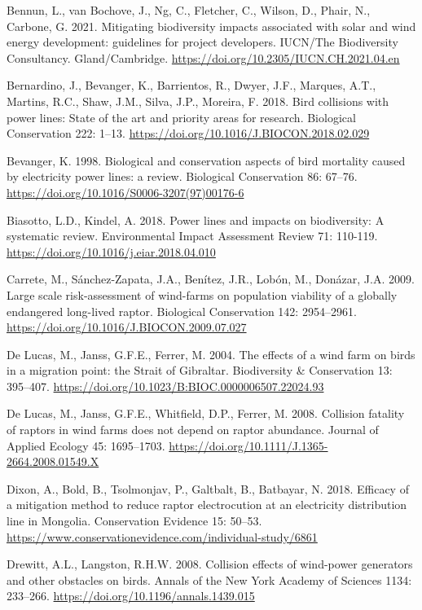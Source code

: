 \documentclass[
  oneside]{scrbook}
\begin{document}
Bennun, L., van Bochove, J., Ng, C., Fletcher, C., Wilson, D., Phair, N., Carbone, G. 2021. Mitigating biodiversity impacts associated with solar and wind energy development: guidelines for project developers. IUCN/The Biodiversity Consultancy. Gland/Cambridge. \url{https://doi.org/10.2305/IUCN.CH.2021.04.en}

Bernardino, J., Bevanger, K., Barrientos, R., Dwyer, J.F., Marques, A.T., Martins, R.C., Shaw, J.M., Silva, J.P., Moreira, F. 2018. Bird collisions with power lines: State of the art and priority areas for research. Biological Conservation 222: 1--13. \url{https://doi.org/10.1016/J.BIOCON.2018.02.029}

Bevanger, K. 1998. Biological and conservation aspects of bird mortality caused by electricity power lines: a review. Biological Conservation 86: 67--76. \url{https://doi.org/10.1016/S0006-3207(97)00176-6}

Biasotto, L.D., Kindel, A. 2018. Power lines and impacts on biodiversity: A systematic review. Environmental Impact Assessment Review 71: 110-119. \url{https://doi.org/10.1016/j.eiar.2018.04.010}

Carrete, M., Sánchez-Zapata, J.A., Benítez, J.R., Lobón, M., Donázar, J.A. 2009. Large scale risk-assessment of wind-farms on population viability of a globally endangered long-lived raptor. Biological Conservation 142: 2954--2961. \url{https://doi.org/10.1016/J.BIOCON.2009.07.027}

De Lucas, M., Janss, G.F.E., Ferrer, M. 2004. The effects of a wind farm on birds in a migration point: the Strait of Gibraltar. Biodiversity \& Conservation 13: 395--407. \url{https://doi.org/10.1023/B:BIOC.0000006507.22024.93}

De Lucas, M., Janss, G.F.E., Whitfield, D.P., Ferrer, M. 2008. Collision fatality of raptors in wind farms does not depend on raptor abundance. Journal of Applied Ecology 45: 1695--1703. \url{https://doi.org/10.1111/J.1365-2664.2008.01549.X}

Dixon, A., Bold, B., Tsolmonjav, P., Galtbalt, B., Batbayar, N. 2018. Efficacy of a mitigation method to reduce raptor electrocution at an electricity distribution line in Mongolia. Conservation Evidence 15: 50--53. \url{https://www.conservationevidence.com/individual-study/6861}

Drewitt, A.L., Langston, R.H.W. 2008. Collision effects of wind-power generators and other obstacles on birds. Annals of the New York Academy of Sciences 1134: 233--266. \url{https://doi.org/10.1196/annals.1439.015}
\end{document}
